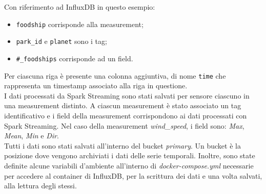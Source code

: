 \documentclass{article}
\begin{document}
\smallskip
\noindent
Con riferimento ad InfluxDB in questo esempio:
\begin{itemize}[noitemsep]
    \item \texttt{foodship} corrisponde alla measurement;
    \item \texttt{park\_id} e \texttt{planet} sono i tag;
    \item \texttt{\#\_foodships} corrisponde ad un field.
\end{itemize}

\noindent
Per ciascuna riga è presente una colonna aggiuntiva, di nome \texttt{time} che rappresenta un timestamp associato alla riga in questione.\\

\noindent
I dati processati da Spark Streaming sono stati salvati per sensore ciascuno in una measurement distinto. A ciascun measurement è stato associato un tag identificativo e i field della measurement corrispondono ai dati processati con Spark Streaming. Nel caso della measurement \textit{wind\_speed}, i field sono: \textit{Max}, \textit{Mean}, \textit{Min} e \textit{Dir}. \\
Tutti i dati sono stati salvati all'interno del bucket \textit{primary}. Un bucket è la posizione dove vengono archiviati i dati delle serie temporali.
Inoltre, sono state definite alcune variabili d'ambiente all'interno di \textit{docker-compose.yml} necessarie per accedere al container di InfluxDB, per la scrittura dei dati e una volta salvati, alla lettura degli stessi.
\end{document}
